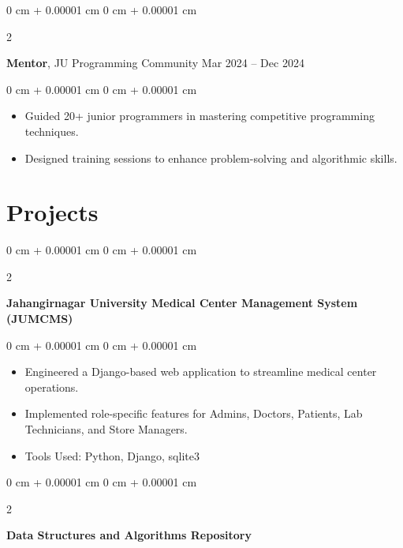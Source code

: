 \documentclass[10pt, letterpaper]{article}
\newenvironment{highlights}{
	\begin{itemize}[
		topsep=0.10 cm,
		parsep=0.10 cm,
		partopsep=0pt,
		itemsep=0pt,
		leftmargin=0 cm + 10pt
		]
	}{
	\end{itemize}
} %
\newenvironment{onecolentry}{
	\begin{adjustwidth}{
			0 cm + 0.00001 cm
		}{
			0 cm + 0.00001 cm
		}
	}{
	\end{adjustwidth}
} %
\newenvironment{twocolentry}[2][]{
	\onecolentry
	\def\secondColumn{#2}
	\setcolumnwidth{\fill, 4.5 cm}
	\begin{paracol}{2}
	}{
		\switchcolumn \raggedleft \secondColumn
	\end{paracol}
	\endonecolentry
} %
\begin{document}
	
	\vspace{0.2 cm}
	
	\begin{twocolentry}{
			Mar 2024 – Dec 2024
		}
		\textbf{Mentor}, JU Programming Community\end{twocolentry}
	
	\vspace{0.10 cm}
	\begin{onecolentry}
		\begin{highlights}
			\item Guided 20+ junior programmers in mastering competitive programming techniques.
			\item Designed training sessions to enhance problem-solving and algorithmic skills.
			
		\end{highlights}
	\end{onecolentry}
	
	
	
	
	
	\section{Projects}
	
	
	
	
\begin{twocolentry}{
		\href{https://github.com/sudiptarathi2020/JUMCMS-Jahangirnagar-University-Medical-Center-Management-System/}{{\faGithub}}
	}
	\textbf{Jahangirnagar University Medical Center Management System (JUMCMS)}
\end{twocolentry}

	
	\vspace{0.10 cm}
	\begin{onecolentry}
		\begin{highlights}
			\item Engineered a Django-based web application to streamline medical center operations.
			\item Implemented role-specific features for Admins, Doctors, Patients, Lab Technicians, and Store Managers.
			\item Tools Used: Python, Django, sqlite3
		\end{highlights}
	\end{onecolentry}
	
	
	\vspace{0.2 cm}
	
	\begin{twocolentry}{
			\href{https://github.com/sudiptarathi2020/Data-structures-and-Algorithms}{{\faGithub}}
		}
		\textbf{Data Structures and Algorithms Repository}\end{twocolentry}
	
\end{document}

